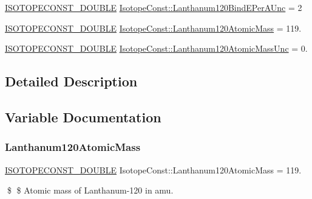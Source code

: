 \begin{DoxyCompactItemize}
\mbox{\hyperlink{group___isotope_const-_macros_ga8f45a7272ce02c0b4c65c44636ed719a}{I\+S\+O\+T\+O\+P\+E\+C\+O\+N\+S\+T\+\_\+\+D\+O\+U\+B\+LE}} \mbox{\hyperlink{group___isotope_const-_lanthanum-_la120_ga6334aa015500b02e2844e7dbb78a0703}{Isotope\+Const\+::\+Lanthanum120\+Bind\+E\+Per\+A\+Unc}} = 2
\item 
\mbox{\hyperlink{group___isotope_const-_macros_ga8f45a7272ce02c0b4c65c44636ed719a}{I\+S\+O\+T\+O\+P\+E\+C\+O\+N\+S\+T\+\_\+\+D\+O\+U\+B\+LE}} \mbox{\hyperlink{group___isotope_const-_lanthanum-_la120_gad572062825a01750253774b36a5d1c6a}{Isotope\+Const\+::\+Lanthanum120\+Atomic\+Mass}} = 119.
\item 
\mbox{\hyperlink{group___isotope_const-_macros_ga8f45a7272ce02c0b4c65c44636ed719a}{I\+S\+O\+T\+O\+P\+E\+C\+O\+N\+S\+T\+\_\+\+D\+O\+U\+B\+LE}} \mbox{\hyperlink{group___isotope_const-_lanthanum-_la120_ga8b0518ac3031ec9491dcb97384cf7814}{Isotope\+Const\+::\+Lanthanum120\+Atomic\+Mass\+Unc}} = 0.
\end{DoxyCompactItemize}


\subsection{Detailed Description}


\subsection{Variable Documentation}
\mbox{\label{group___isotope_const-_lanthanum-_la120_gad572062825a01750253774b36a5d1c6a}} 
\subsubsection{\texorpdfstring{Lanthanum120\+Atomic\+Mass}{Lanthanum120AtomicMass}}
{\footnotesize\ttfamily \mbox{\hyperlink{group___isotope_const-_macros_ga8f45a7272ce02c0b4c65c44636ed719a}{I\+S\+O\+T\+O\+P\+E\+C\+O\+N\+S\+T\+\_\+\+D\+O\+U\+B\+LE}} Isotope\+Const\+::\+Lanthanum120\+Atomic\+Mass = 119.}

\$ \$ Atomic mass of Lanthanum-\/120 in amu. \mbox{\label{group___isotope_const-_lanthanum-_la120_ga8b0518ac3031ec9491dcb97384cf7814}} 
